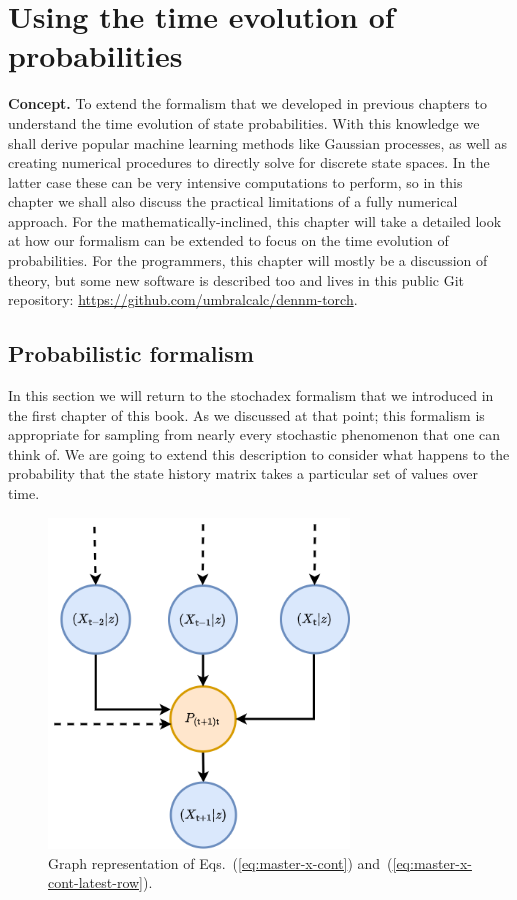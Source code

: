 \chapter{\sffamily Using the time evolution of probabilities}

{\bfseries\sffamily Concept.} To extend the formalism that we developed in previous chapters to understand the time evolution of state probabilities. With this knowledge we shall derive popular machine learning methods like Gaussian processes, as well as creating numerical procedures to directly solve for discrete state spaces. In the latter case these can be very intensive computations to perform, so in this chapter we shall also discuss the practical limitations of a fully numerical approach. For the mathematically-inclined, this chapter will take a detailed look at how our formalism can be extended to focus on the time evolution of probabilities. For the programmers, this chapter will mostly be a discussion of theory, but some new software is described too and lives in this public Git repository: \href{https://github.com/umbralcalc/dennm-torch}{https://github.com/umbralcalc/dennm-torch}.

\section{\sffamily Probabilistic formalism}

In this section we will return to the stochadex formalism that we introduced in the first chapter of this book. As we discussed at that point; this formalism is appropriate for sampling from nearly every stochastic phenomenon that one can think of. We are going to extend this description to consider what happens to the probability that the state history matrix takes a particular set of values over time.

\begin{figure}[h]
\centering
\includegraphics[width=8cm]{images/chapter-3-master-eq-graph.drawio.png}
\caption{Graph representation of Eqs.~(\ref{eq:master-x-cont}) and~(\ref{eq:master-x-cont-latest-row}).}
\label{fig:master-eqn}
\end{figure} 

